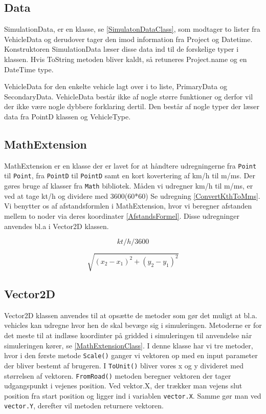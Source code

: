 \subsection{Data}
SimulationData, er en klasse, se \ref{SimulatonDataClass}, som modtager to lister fra VehicleData og derudover tager den imod information fra Project og Datetime. Konstruktoren SimulationData læser disse data ind til de forskelige typer i klassen. Hvis ToString metoden bliver kaldt, så retuneres Project.name og en DateTime type.


VehicleData for den enkelte vehicle lagt over i to liste, PrimaryData og SecondaryData. VehicleData består ikke af nogle større funktioner og derfor vil der ikke være nogle dybbere forklaring dertil. Den består af nogle typer der læser data fra PointD klassen og VehicleType.

\subsection{MathExtension}
MathExtension er en klasse der er lavet for at håndtere udregningerne fra \texttt{Point} til \texttt{Point}, fra \texttt{PointD} til \texttt{PointD} samt en kort kovertering af km/h til m/ms. Der gøres bruge af klasser fra \texttt{Math} bibliotek. Måden vi udregner km/h til m/ms, er ved at tage kt/h og dividere med 3600(60*60) Se udregning \ref{ConvertKthToMms}. Vi benytter os af afstandsformlen i MathExtension, hvor vi beregner afstanden mellem to noder via deres koordinater \ref{AfstandsFormel}. Disse udregninger anvendes bl.a i Vector2D klassen.

\begin{equation} \label{ConvertKthToMms}
kt/h / 3600
\end{equation}

\begin{equation} \label{AfstandsFormel}
\sqrt{(x_2 - x_1)^2 + (y_2 - y_1)^2}
\end{equation}

\subsection{Vector2D}
Vector2D klassen anvendes til at opsætte de metoder som gør det muligt at bl.a. vehicles kan udregne hvor hen de skal bevæge sig i simuleringen. Metoderne er for det meste til at indlæse koordinter på gridded i simuleringen til anvendelse når simuleringen kører, se \ref{MathExtensionClass}. I denne klasse har vi tre metoder, hvor i den første metode \texttt{Scale()} ganger vi vektoren op med en input parameter der bliver bestemt af brugeren. I \texttt{ToUnit()} bliver vores x og y divideret med størrelsen af vektoren. \texttt{FromRoad()} metoden beregner vektoren der tager udgangspunkt i vejenes position. Ved vektor.X, der trækker man vejens slut position fra start position og ligger ind i variablen \texttt{vector.X}. Samme gør man ved \texttt{vector.Y}, derefter vil metoden returnere vektoren.

